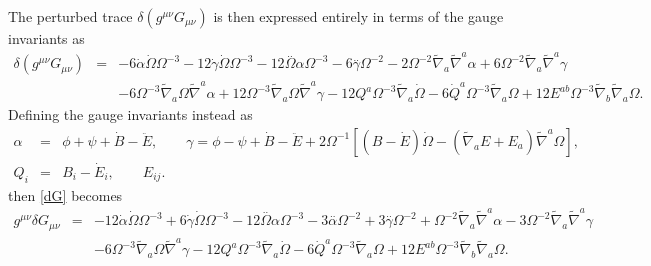 \documentclass[10pt,letterpaper]{article}
\numberwithin{equation}{section}
\begin{document}
The perturbed trace $\delta(g^{\mu\nu} G_{\mu\nu})$ is then expressed entirely in terms of the gauge invariants as
\begin{eqnarray}
\delta(g^{\mu\nu} G_{\mu\nu})&=& -6 \dot{\alpha} \dot{\Omega} \Omega^{-3} - 12 \dot{\gamma} \dot{\Omega} \Omega^{-3} - 12 \overset{..}{\Omega} \alpha \Omega^{-3} - 6 \overset{..}{\gamma} \Omega^{-2} - 2 \Omega^{-2} \tilde{\nabla}_{a}\tilde{\nabla}^{a}\alpha + 6 \Omega^{-2} \tilde{\nabla}_{a}\tilde{\nabla}^{a}\gamma \nonumber \\ 
&& - 6 \Omega^{-3} \tilde{\nabla}_{a}\Omega \tilde{\nabla}^{a}\alpha + 12 \Omega^{-3} \tilde{\nabla}_{a}\Omega \tilde{\nabla}^{a}\gamma -12 Q^{a} \Omega^{-3} \tilde{\nabla}_{a}\dot{\Omega} - 6 \dot{Q}^{a} \Omega^{-3} \tilde{\nabla}_{a}\Omega +12 E^{ab} \Omega^{-3} \tilde{\nabla}_{b}\tilde{\nabla}_{a}\Omega.
\label{dGtr1}
\end{eqnarray}
Defining the gauge invariants instead as
\begin{eqnarray}
\alpha &=& \phi + \psi +\dot B - \ddot E,\qquad \gamma =\phi- \psi+\dot B - \ddot E + 2\Omega^{-1}[(B-\dot E)\dot\Omega - (\tilde\nabla_a E + E_a)\tilde\nabla^a \Omega],
\nonumber\\
Q_i&=& B_i - \dot E_i,\qquad E_{ij}.
\end{eqnarray}
then \eqref{dG} becomes
\begin{eqnarray}
g^{\mu\nu}\delta G_{\mu\nu}&=& -12 \dot{\alpha} \dot{\Omega} \Omega^{-3} + 6 \dot{\gamma} \dot{\Omega} \Omega^{-3} - 12 \overset{..}{\Omega} \alpha \Omega^{-3} - 3 \overset{..}{\alpha} \Omega^{-2} + 3 \overset{..}{\gamma} \Omega^{-2} + \Omega^{-2} \tilde{\nabla}_{a}\tilde{\nabla}^{a}\alpha - 3 \Omega^{-2} \tilde{\nabla}_{a}\tilde{\nabla}^{a}\gamma \nonumber \\ 
&& - 6 \Omega^{-3} \tilde{\nabla}_{a}\Omega \tilde{\nabla}^{a}\gamma -12 Q^{a} \Omega^{-3} \tilde{\nabla}_{a}\dot{\Omega} - 6 \dot{Q}^{a} \Omega^{-3} \tilde{\nabla}_{a}\Omega +12 E^{ab} \Omega^{-3} \tilde{\nabla}_{b}\tilde{\nabla}_{a}\Omega .
\end{eqnarray}

\end{document}
